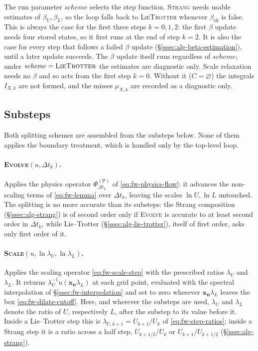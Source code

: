 \documentclass{article}
\begin{document}
The run parameter $\mathit{scheme}$ selects the step function. \textsc{Strang}
needs usable estimates of $\beta_U, \beta_L$, so the loop falls back to
\textsc{LieTrotter} whenever $\beta_{\mathrm{ok}}$ is false. This is always
the case for the first three steps $k = 0, 1, 2$: the first $\beta$ update
needs four stored states, so it first runs at the end of step $k = 2$. It is
also the case for every step that follows a failed $\beta$ update
(\S\ref{ssec:alg-beta-estimation}), until a later update succeeds. The $\beta$
update itself runs regardless of $\mathit{scheme}$; under
$\mathit{scheme} = \textsc{LieTrotter}$ the estimates are diagnostic only.
Scale relaxation needs no $\beta$ and so acts from the first step $k = 0$.
Without it ($C = \varnothing$) the integrals $I_{X,k}$ are not formed, and the
misses $\mu_{X,k}$ are recorded as a diagnostic only.

\subsection{Substeps}\label{ssec:alg-substeps}
Both splitting schemes are assembled from the substeps below. None of them
applies the boundary treatment, which is handled only by the top-level loop.

\paragraph{\textsc{Evolve}$(u, \Delta t_k)$.}
Applies the physics operator $\Phi_{\Delta t_k}^{(\mathrm{P})}$ of
\eqref{eq:fw-physics-flow}: it advances the non-scaling terms of
\eqref{eq:fw-lemma} over $\Delta t_k$, leaving the scales $\ln U, \ln L$
untouched. The splitting is no more accurate than its substeps: the Strang
composition (\S\ref{ssec:alg-strang}) is of second order only if
\textsc{Evolve} is accurate to at least second order in $\Delta t_k$, while
Lie--Trotter (\S\ref{ssec:alg-lie-trotter}), itself of first order, asks only
first order of it.

\paragraph{\textsc{Scale}$(u, \ln \lambda_U, \ln \lambda_L)$.}
Applies the scaling operator \eqref{eq:fw-scale-step} with the prescribed
ratios $\lambda_U$ and $\lambda_L$. It returns
$\lambda_U^{-1} u(\mathbf{x_n} \lambda_L)$ at each grid point, evaluated with
the spectral interpolation of
\S\ref{ssec:fw-interpolation} and set to zero wherever $\mathbf{x_n}\lambda_L$
leaves the box \eqref{eq:fw-dilate-cutoff}. Here, and wherever the substeps are used,
$\lambda_U$ and $\lambda_L$ denote the ratio of $U$, respectively $L$, after the
substep to its value before it. Inside a Lie--Trotter step this is
$\lambda_{U,k+1} = U_{k+1}/U_k$ of \eqref{eq:fw-step-ratios}; inside a Strang step it
is a ratio across a half step, $U_{k+1/2}/U_k$ or $U_{k+1}/U_{k+1/2}$
(\S\ref{ssec:alg-strang}).
\end{document}
